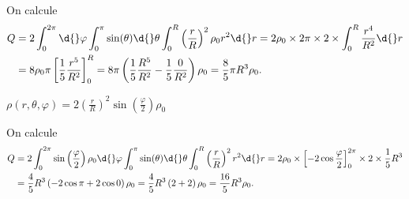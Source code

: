 
\begin{corrige}
On calcule
	\begin{align*}
		Q &= 2 \int_{0}^{2\pi} \d{} \varphi \int_{0}^{\pi} \sin (\theta) \d{} \theta \int_{0}^{R} \left( \frac{r}{R} \right)^2\rho_0 r^2 \d{}r
		 = 2\rho_0 \times 2 \pi \times 2 \times \int_{0}^{R} \frac{r^4}{R^2} \d{}r \\
		 &= 8\rho_0\pi \left[ \frac{1}{5} \frac{r^5}{R^2} \right]^{R}_{0} = 8\pi \left( \frac{1}{5} \frac{R^5}{R^2} - \frac{1}{5} \frac{0}{R^2} \right)\rho_0 = \frac{8}{5}\pi R^3\rho_0.
	\end{align*}
\end{corrige}




\begin{enonce}	
	$\rho(r,\theta,\varphi) = 2\left(\frac{r}{R}\right)^2\sin\left(\frac{\varphi}{2}\right)\rho_0$
\end{enonce}


\begin{corrige}
On calcule
	\begin{align*}
		Q &= 2 \int_{0}^{2\pi}  \sin \left( \frac{\varphi}{2} \right)\rho_0 \d{} \varphi \int_{0}^{\pi} \sin (\theta) \d{} \theta \int_{0}^{R} \left( \frac{r}{R} \right)^2 r^2 \d{}r
		 = 2\rho_0 \times \left[ -2 \cos \frac{\varphi}{2} \right]^{2\pi}_{0} \times 2 \times \frac{1}{5}R^3\\
		 &= \frac{4}{5}R^3 \left( -2 \cos \pi + 2 \cos 0  \right)\rho_0
		 = \frac{4}{5}R^3 \left( 2+ 2 \right)\rho_0 = \frac{16}{5}R^3\rho_0.
	\end{align*}
\end{corrige}

\finEntrainement



\newpage



